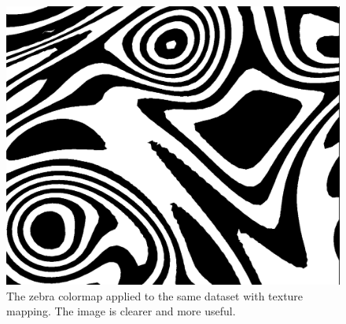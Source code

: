		\begin{figure}[htb]
			  \centering
			  \includegraphics[scale=.2]{./content/pictures/zebra_texture.png}
			  \caption{The zebra colormap applied to the same dataset with texture mapping. The image is clearer and more useful.}
			  \label{fig:with_textures}
		\end{figure}

\clearpage